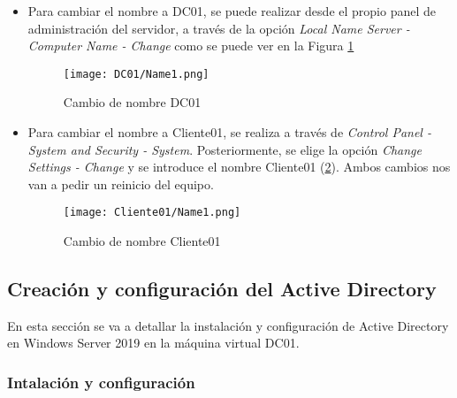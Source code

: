 \begin{itemize}
\item Para cambiar el nombre a DC01, se puede realizar desde el propio panel de ad\-mi\-nis\-tra\-ción del servidor, a través de la opción {\it Local Name Server - Computer Name - Change} como se puede ver en la Figura \ref{DC01-Name1}
\begin{figure}[H] %
\begin{center}
\texttt{[image: DC01/Name1.png]}
\end{center}
\caption{Cambio de nombre DC01}
\label{DC01-Name1}
\end{figure}

\item Para cambiar el nombre a Cliente01, se realiza a través de {\it Control Panel - System and Security - System}. Posteriormente, se elige la opción {\it Change Settings - Change} y se introduce el nombre Cliente01 (\ref{Cliente01-Name1}). Ambos cambios nos van a pedir un reinicio del equipo. 
\begin{figure}[H] %
\begin{center}
\texttt{[image: Cliente01/Name1.png]}
\end{center}
\caption{Cambio de nombre Cliente01}
\label{Cliente01-Name1}
\end{figure}

\end{itemize}

\subsection{Creación y configuración del Active Directory}

En esta sección se va a detallar la instalación y configuración de Active Directory en Windows Server 2019 en la máquina virtual DC01.

\subsubsection{Intalación y configuración}

